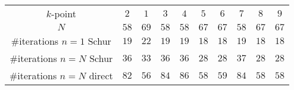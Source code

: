 \begin{tabular}{cccccccccc}
$k$-point & $2$ & $1$ & $3$ & $4$ & $5$ & $6$ & $7$ & $8$ & $9$\\
$N$ & $58$ & $69$ & $58$ & $58$ & $67$ & $67$ & $58$ & $67$ & $67$\\
\#iterations $n=1$ Schur & $19$ & $22$ & $19$ & $19$ & $18$ & $18$ & $19$ & $18$ & $18$\\
\#iterations $n=N$ Schur & $36$ & $33$ & $36$ & $36$ & $28$ & $28$ & $37$ & $28$ & $28$\\
\#iterations $n=N$ direct & $82$ & $56$ & $84$ & $86$ & $58$ & $59$ & $84$ & $58$ & $58$\\
\end{tabular}

